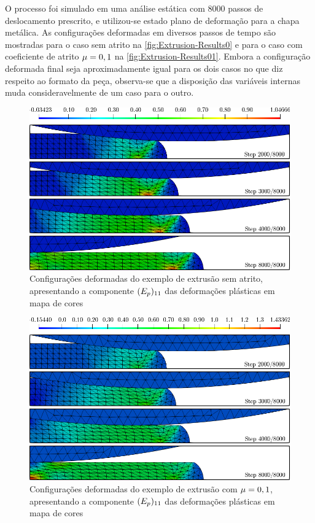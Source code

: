 \documentclass[Tese.tex]{subfiles}
\begin{document}
O processo foi simulado em uma análise estática com $8000$ passos de deslocamento prescrito, e utilizou-se estado plano de deformação para a chapa metálica. As configurações deformadas em diversos passos de tempo são mostradas para o caso sem atrito na \autoref{fig:Extrusion-Results0} e para o caso com coeficiente de atrito $\mu=0,1$ na \autoref{fig:Extrusion-Results01}. Embora a configuração deformada final seja aproximadamente igual para os dois casos no que diz respeito ao formato da peça, observa-se que a disposição das variáveis internas muda consideravelmente de um caso para o outro.

\begin{figure}[!htb]
	\centering
	\caption{Configurações deformadas do exemplo de extrusão sem atrito, apresentando a componente $({E}_p)_{11}$ das deformações plásticas em mapa de cores}
	\label{fig:Extrusion-Results0}
	\includegraphics[scale=0.45]{Figuras/ExemplosContato/ExtrusionResults.png}
\end{figure}

\begin{figure}[!htb]
	\centering
	\caption{Configurações deformadas do exemplo de extrusão com $\mu = 0,1$, apresentando a componente $({E}_p)_{11}$ das deformações plásticas em mapa de cores}
	\label{fig:Extrusion-Results01}
	\includegraphics[scale=0.45]{Figuras/ExemplosContato/ExtrusionResults-Friction.png}
\end{figure}
\end{document}
